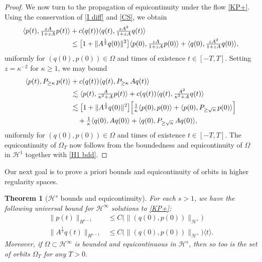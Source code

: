 \documentclass{amsart}
\newtheorem{theorem}{Theorem}[section]
\theoremstyle{definition}
\numberwithin{equation}{section}
\renewcommand{\H}{\mathcal H}
\newcommand{\la}{\langle}
\newcommand{\ra}{\rangle}
\begin{document}
\begin{proof}
We now turn to the propagation of equicontinuity under the flow \eqref{KP+}. Using the conservation of \eqref{I diff} and \eqref{CS}, we obtain
\begin{align}\label{659}
\langle p(t),\tfrac{zA}{1+zA}p(t)\rangle &+ c(q(t)) \langle q(t),\tfrac{zA^2}{1+zA}q(t)\rangle\notag\\
&\leq  \bigl[1+ \|A^{\frac12}q(0)\|^2\bigr]\langle p(0),\tfrac{zA}{1+zA}p(0)\rangle + \langle q(0), \tfrac{zA^2}{1+zA} q(0)\rangle,
\end{align}
uniformly for $(q(0),p(0))\in \Omega$ and times of existence $t\in[-T,T]$. Setting $z = \kappa^{-2}$ for $\kappa\geq 1$, we may bound
\begin{align*}
\langle p(t),P_{\geq  \kappa}\, p(t)\rangle &+ c(q(t))\langle q(t),P_{\geq  \kappa}\, Aq(t)\rangle\\
&\lesssim\langle p(t),\tfrac{A}{\kappa^2+A}p(t)\rangle + c(q(t)) \langle q(t),\tfrac{A^2}{\kappa^2+A}q(t)\rangle\\
&\lesssim \bigl[1+ \|A^{\frac12}q(0)\|^2\bigr]\Bigl[\tfrac1\kappa\la p(0),p(0)\ra + \langle p(0),P_{\geq \sqrt \kappa}\, p(0)\rangle\Bigr] \\
&\quad+  \tfrac1\kappa\langle q(0),A q(0)\rangle+ \langle q(0),P_{\geq \sqrt \kappa}\, Aq(0)\rangle,
\end{align*}
uniformly for $(q(0),p(0))\in \Omega$ and times of existence $t\in[-T,T]$.  The equicontinuity of $\Omega_T$ now follows from the boundedness and equicontinuity of $\Omega$ in $\H^1$ together with \eqref{H1 bdd}.
\end{proof}

Our next goal is to prove a priori bounds and equicontinuity of orbits in higher regularity spaces.

\begin{theorem}[$\H^s$ bounds and equicontinuity]\label{T:equicontinuity_Hs} For each $s>1$, we have the following universal bound for $\H^\infty$ solutions to \eqref{KP+}:
\begin{equation}\label{Hs bdd}
\begin{aligned}
\|p(t)\|_{H^{s-1}} &\leq C\bigl(\|(q(0),p(0))\|_{\H^s}\bigr)\\
\|A^\frac12 q(t)\|_{H^{s-1}} &\leq C\bigl(\|(q(0),p(0))\|_{\H^s}\bigr) \la t\ra.
\end{aligned}
\end{equation}
Moreover, if $\Omega \subset \H^\infty$ is bounded and equicontinuous in $\H^s$, then so too is the set of orbits $\Omega_T$ for any $T>0$.
\end{theorem}
\end{document}
